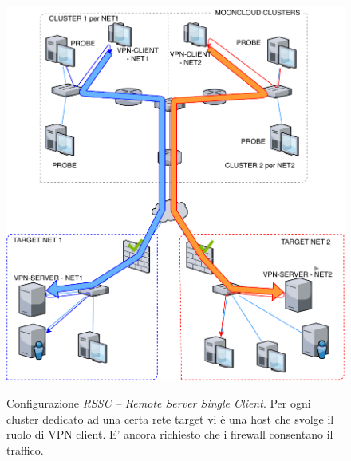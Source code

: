 \begin{figure}
  \includegraphics[scale=0.6]{img/rssc}
  \label{fig:rsmc}
  \caption[Configurazione \textit{RSSC -- Remote Server Single Client}]{Configurazione
  \textit{RSSC -- Remote Server Single Client}. Per ogni cluster dedicato ad una certa rete target
  vi è una host che svolge il ruolo di VPN client. E' ancora richiesto che i firewall
  consentano il traffico.}
\end{figure}

